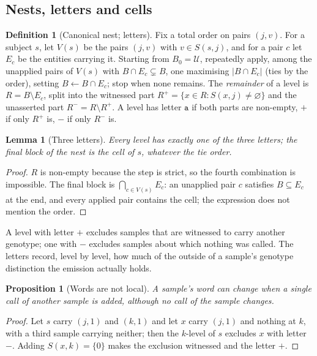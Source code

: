 \documentclass[11pt,twocolumn,a4paper]{article}
\theoremstyle{plain}
\newtheorem{proposition}[theorem]{Proposition}
\newtheorem{lemma}[theorem]{Lemma}
\theoremstyle{definition}
\newtheorem{definition}[theorem]{Definition}
\theoremstyle{remark}
\newcommand{\U}{\mathcal{U}}
\newcommand{\cp}{\mathord{+}}
\newcommand{\cm}{\mathord{-}}
\newcommand{\Desc}{V}
\newcommand{\la}{\mathtt{a}}
\newcommand{\lp}{\mathtt{+}}
\newcommand{\lm}{\mathtt{-}}
\begin{document}
\subsection{Nests, letters and cells}

\begin{definition}[Canonical nest; letters]
\label{def:nest}
Fix a total order on pairs $(j,v)$. For a subject $s$, let $\Desc(s)$ be the
pairs $(j,v)$ with $v\in S(s,j)$, and for a pair $c$ let $E_c$ be the entities
carrying it. Starting from $B_0=\U$, repeatedly apply, among the unapplied
pairs of $\Desc(s)$ with $B\cap E_c\subsetneq B$, one maximising
$|B\cap E_c|$ (ties by the order), setting $B\leftarrow B\cap E_c$; stop when
none remains. The \emph{remainder} of a level is $R=B\setminus E_c$, split
into the witnessed part $R^{\cp}=\{x\in R:S(x,j)\ne\varnothing\}$ and the
unasserted part $R^{\cm}=R\setminus R^{\cp}$. A level has letter $\la$ if both
parts are non-empty, $\lp$ if only $R^{\cp}$ is, $\lm$ if only $R^{\cm}$ is.
\end{definition}

\begin{lemma}[Three letters]
\label{lem:letters}
Every level has exactly one of the three letters; the final block of the nest
is the cell of $s$, whatever the tie order.
\end{lemma}

\begin{proof}
$R$ is non-empty because the step is strict, so the fourth combination is
impossible. The final block is $\bigcap_{c\in\Desc(s)}E_c$: an unapplied pair
$c$ satisfies $B\subseteq E_c$ at the end, and every applied pair contains the
cell; the expression does not mention the order.
\end{proof}

A level with letter $\lp$ excludes samples that are witnessed to carry another
genotype; one with $\lm$ excludes samples about which nothing was called. The
letters record, level by level, how much of the outside of a sample's
genotype distinction the emission actually holds.

\begin{proposition}[Words are not local]
\label{prop:words}
A sample's word can change when a single call of another sample is added,
although no call of the sample changes.
\end{proposition}

\begin{proof}
Let $s$ carry $(j,1)$ and $(k,1)$ and let $x$ carry $(j,1)$ and nothing at $k$,
with a third sample carrying neither; then the $k$-level of $s$ excludes $x$
with letter $\lm$. Adding $S(x,k)=\{0\}$ makes the exclusion witnessed and the
letter $\lp$.
\end{proof}
\end{document}
